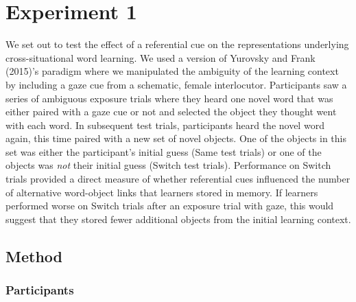 \documentclass[oneside]{report}
\begin{document}
\section{Experiment 1}\label{experiment-1-1}

We set out to test the effect of a referential cue on the
representations underlying cross-situational word learning. We used a
version of Yurovsky and Frank (2015)'s paradigm where we manipulated the
ambiguity of the learning context by including a gaze cue from a
schematic, female interlocutor. Participants saw a series of ambiguous
exposure trials where they heard one novel word that was either paired
with a gaze cue or not and selected the object they thought went with
each word. In subsequent test trials, participants heard the novel word
again, this time paired with a new set of novel objects. One of the
objects in this set was either the participant's initial guess (Same
test trials) or one of the objects was \emph{not} their initial guess
(Switch test trials). Performance on Switch trials provided a direct
measure of whether referential cues influenced the number of alternative
word-object links that learners stored in memory. If learners performed
worse on Switch trials after an exposure trial with gaze, this would
suggest that they stored fewer additional objects from the initial
learning context.

\subsection{Method}\label{method}

\subsubsection{Participants}\label{participants-2}
\end{document}
